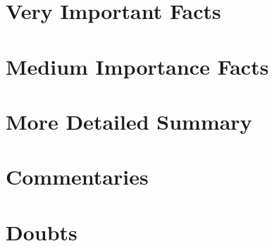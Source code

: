 \documentclass[12pt]{report}
\begin{document}
\section{Very Important Facts}

\section{Medium Importance Facts}

\section{More Detailed Summary}

\section{Commentaries}

\section{Doubts}
\end{document}
